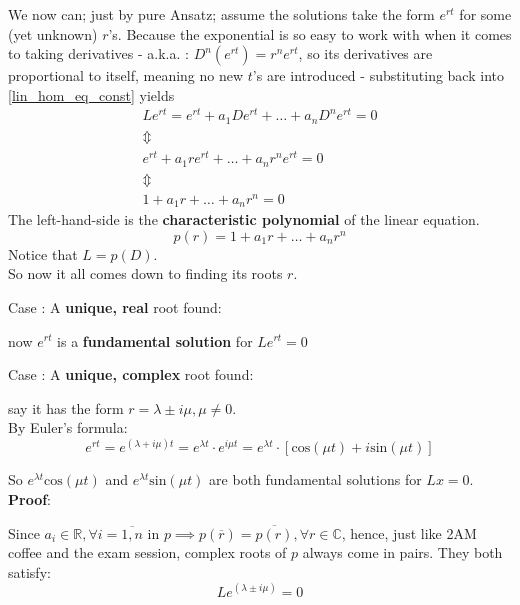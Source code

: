 We now can; just by pure Ansatz; assume the solutions take the form $e^{rt}$ for some (yet unknown) $r$'s. Because the exponential is so easy to work with when it comes to taking derivatives - a.k.a. : $D^n(e^{rt})=r^ne^{rt}$, so its derivatives are proportional to itself, meaning no new $t$'s are introduced - substituting back into \ref{lin_hom_eq_const} yields
\begin{gather*}
    Le^{rt} = e^{rt} + a_1 De^{rt} + \dots +a_{n} D^ne^{rt} = 0      \\
    \Updownarrow \\
    e^{rt}+a_1re^{rt} + \dots + a_nr^ne^{rt} =0 \\
    \Updownarrow \\
    1 + a_1r + \dots + a_nr^n =0
\end{gather*}
The left-hand-side is the \textbf{characteristic polynomial} of the linear equation.
\[
    p(r) = 1 + a_1r + \dots + a_nr^n
\]
Notice that $L = p(D)$. \\
So now it all comes down to finding its roots $r$.

Case : A \textbf{unique, real} root found:

now $e^{rt}$ is a \textbf{fundamental solution} for $Le^{rt}=0$ \par
\newpage
Case : A \textbf{unique, complex} root found:

say it has the form $r = \lambda \pm i\mu, \mu \neq 0$. \\
By Euler's formula:
\begin{equation}\label{euler}
    e^{rt} = e^{(\lambda + i\mu)t} = e^{\lambda t} \cdot e^{i \mu t}  =  e^{\lambda t} \cdot [\text{cos}(\mu t) + i \text{sin}(\mu t)]
\end{equation}

So $e^{\lambda t}\text{cos}(\mu t)$ and $e^{\lambda t}\text{sin}(\mu t)$ are both fundamental solutions for $Lx=0$.\\

\textbf{Proof}: \par
Since $a_i \in \mathbb{R}, \forall i=\overline{1,n}$ in $p \implies p(\overline{r})=\overline{p(r)}, \forall r \in \mathbb{C}$, hence, just like 2AM coffee and the exam session, complex roots of $p$ always come in pairs. They both satisfy:
\begin{equation}\label{lin_op_solution}
    Le^{(\lambda \pm i \mu)} = 0
\end{equation}

